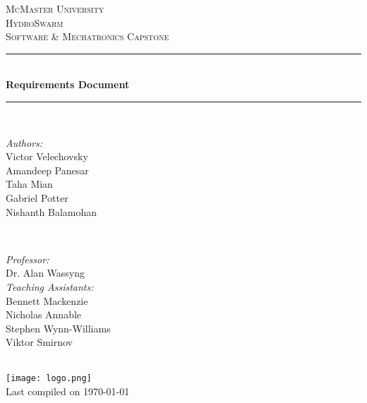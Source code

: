 \documentclass[11pt]{article}
\begin{document}
\newcommand{\PROJECTNAME}{HydroSwarm}

\begin{titlepage}
	\newcommand{\HRule}{\rule{\linewidth}{0.2mm}}
	\begin{center}
	\textsc{\LARGE McMaster University}\\[1.5cm]
	
	\textsc{\Large \PROJECTNAME}\\[0.5cm]
	\textsc{\large Software \& Mechatronics Capstone}\\[0.5cm] 

	\HRule\\[0.4cm]
		{\huge\bfseries Requirements Document}\\[0.4cm]
	\HRule\\[0.4cm]
	
	\begin{minipage}[t][][t]{0.5\textwidth}
		\begin{flushleft} \large
			\emph{Authors:}\\
			Victor Velechovsky \\
			Amandeep Panesar \\
			Taha Mian \\
			Gabriel Potter \\
			Nishanth Balamohan \\
		\end{flushleft}
	\end{minipage}
	~
	\begin{minipage}[t][][t]{0.4\textwidth}
		\begin{flushright} \large
			\emph{Professor:} \\
			Dr. Alan Wassyng \\[0.4cm]
			\emph{Teaching Assistants:} \\
			Bennett Mackenzie \\ 
			Nicholas Annable \\ 
			Stephen Wynn-Williams \\ 
			Viktor Smirnov
		\end{flushright}
	\end{minipage}\\[2cm]
	
	\texttt{[image: logo.png]} \\
	{\large Last compiled on \today}
	\end{center}

\end{titlepage}

\tableofcontents
\listoffigures
\end{document}
